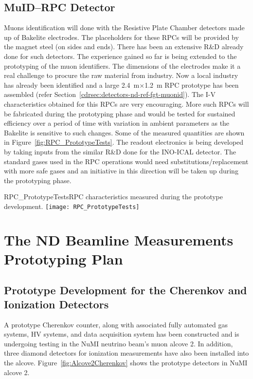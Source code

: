 \subsection{MuID--RPC Detector}   


Muons identification will done with the Resistive Plate Chamber
detectors made up of Bakelite electrodes.  The placeholders for these
RPCs will be provided by the magnet steel (on sides and ends). There
has been an extensive R\&D already done for such detectors. The
experience gained so far is being extended to the prototyping of the
muon identifiers. The dimensions of the electrodes make it a real
challenge to procure the raw material from industry. Now a local
industry has already been identified and a large 2.4~m$\times$1.2~m
RPC prototype has been assembled (refer
Section~\ref{cdrsec:detectors-nd-ref-fgt-muonid}). The I-V
characteristics obtained for this RPCs are very encouraging. More such
RPCs will be fabricated during the prototyping phase and would be
tested for sustained efficiency over a period of time with variation
in ambient parameters as the Bakelite is sensitive to such
changes. Some of the measured quantities are shown in
Figure~\ref{fig:RPC_PrototypeTests}.  The readout electronics is being
developed by taking inputs from the similar R\&D done for the INO-ICAL
detector. The standard gases used in the RPC operations would need
substitutions/replacement with more safe gases and an initiative in
this direction will be taken up during the prototyping phase.
\begin{cdrfigure}  
{RPC_PrototypeTests}{RPC characteristics measured during the prototype development.}  
\texttt{[image: RPC\_PrototypeTests]}
\end{cdrfigure}



\section{The ND Beamline Measurements Prototyping Plan} 
\label{sec:proto-nd-blm}

\subsection{Prototype Development for the Cherenkov and Ionization Detectors}
\label{subsec:proto-blm-muon-cherenkov-proto}

A prototype Cherenkov counter, along with associated fully automated gas systems,
HV systems, and data acquisition system has been constructed and is undergoing
testing in the NuMI neutrino beam's muon alcove 2. In addition, three diamond
detectors\cite{ref:CERNdiamond} for ionization measurements have also been installed into the alcove.
Figure~\ref{fig:Alcove2Cherenkov} shows the prototype detectors in NuMI alcove 2.

